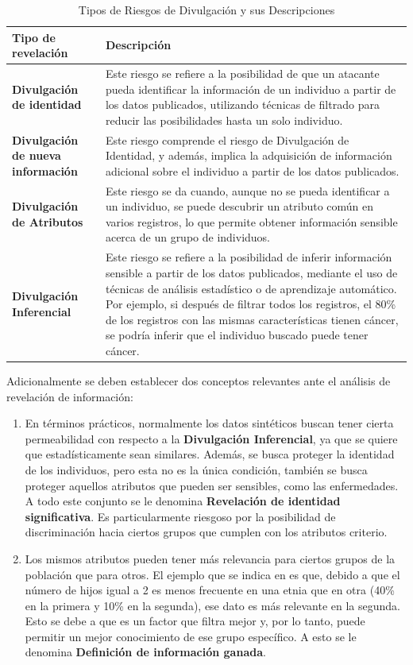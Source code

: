 \begin{table}[H]
	\centering
	\caption{Tipos de Riesgos de Divulgación y sus Descripciones}
	\label{relevantes-definiciones}
    \begin{tabular}{|m{15em}|m{20em}|}
    \hline
    \rowcolor[gray]{0.8}
    Tipo de revelación & Descripción \\
    \hline
    \textbf{Divulgación de identidad} 
    & Este riesgo se refiere a la posibilidad de que un atacante pueda identificar la información de un individuo a partir de los datos publicados, utilizando técnicas de filtrado para reducir las posibilidades hasta un solo individuo.\\
    \hline
    \textbf{Divulgación de nueva información} 
    & Este riesgo comprende el riesgo de Divulgación de Identidad, y además, implica la adquisición de información adicional sobre el individuo a partir de los datos publicados.\\
    \hline
    \textbf{Divulgación de Atributos} 
    & Este riesgo se da cuando, aunque no se pueda identificar a un individuo, se puede descubrir un atributo común en varios registros, lo que permite obtener información sensible acerca de un grupo de individuos.\\
    \hline
    \textbf{Divulgación Inferencial} 
    & Este riesgo se refiere a la posibilidad de inferir información sensible a partir de los datos publicados, mediante el uso de técnicas de análisis estadístico o de aprendizaje automático. Por ejemplo, si después de filtrar todos los registros, el 80\% de los registros con las mismas características tienen cáncer, se podría inferir que el individuo buscado puede tener cáncer.\\
    \hline
    \end{tabular}
\end{table}


Adicionalmente se deben establecer dos conceptos relevantes ante el análisis de revelación de información:
\begin{enumerate}
    \item En términos prácticos, normalmente los datos sintéticos buscan tener cierta permeabilidad con respecto a la \textbf{Divulgación Inferencial}, ya que se quiere que estadísticamente sean similares. Además, se busca proteger la identidad de los individuos, pero esta no es la única condición, también se busca proteger aquellos atributos que pueden ser sensibles, como las enfermedades. A todo este conjunto se le denomina \textbf{Revelación de identidad significativa}. Es particularmente riesgoso por la posibilidad de discriminación hacia ciertos grupos que cumplen con los atributos criterio.
    \item Los mismos atributos pueden tener más relevancia para ciertos grupos de la población que para otros. El ejemplo que se indica en \cite{el_emam_practical_2020} es que, debido a que el número de hijos igual a 2 es menos frecuente en una etnia que en otra (40\% en la primera y 10\% en la segunda), ese dato es más relevante en la segunda. Esto se debe a que es un factor que filtra mejor y, por lo tanto, puede permitir un mejor conocimiento de ese grupo específico. A esto se le denomina \textbf{Definición de información ganada}.
\end{enumerate}

